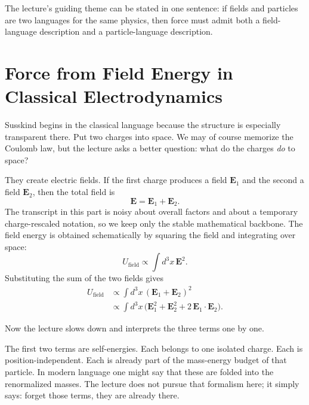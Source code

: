 The lecture's guiding theme can be stated in one sentence: if fields and particles are two languages for the same physics, then force must admit both a field-language description and a particle-language description.

\section{Force from Field Energy in Classical Electrodynamics}

Susskind begins in the classical language because the structure is especially transparent there. Put two charges into space. We may of course memorize the Coulomb law, but the lecture asks a better question: what do the charges \emph{do} to space?

They create electric fields. If the first charge produces a field \(\mathbf{E}_1\) and the second a field \(\mathbf{E}_2\), then the total field is
\begin{equation}
\mathbf{E}=\mathbf{E}_1+\mathbf{E}_2.
\end{equation}
The transcript in this part is noisy about overall factors and about a temporary charge-rescaled notation, so we keep only the stable mathematical backbone. The field energy is obtained schematically by squaring the field and integrating over space:
\begin{equation}
U_{\text{field}}\propto \int d^3x\,\mathbf{E}^2.
\end{equation}
Substituting the sum of the two fields gives
\begin{align}
U_{\text{field}}
&\propto \int d^3x\,(\mathbf{E}_1+\mathbf{E}_2)^2 \\
&\propto \int d^3x\,\bigl(\mathbf{E}_1^2+\mathbf{E}_2^2+2\,\mathbf{E}_1\!\cdot\!\mathbf{E}_2\bigr).
\end{align}

Now the lecture slows down and interprets the three terms one by one.

The first two terms are self-energies. Each belongs to one isolated charge. Each is position-independent. Each is already part of the mass-energy budget of that particle. In modern language one might say that these are folded into the renormalized masses. The lecture does not pursue that formalism here; it simply says: forget those terms, they are already there.

